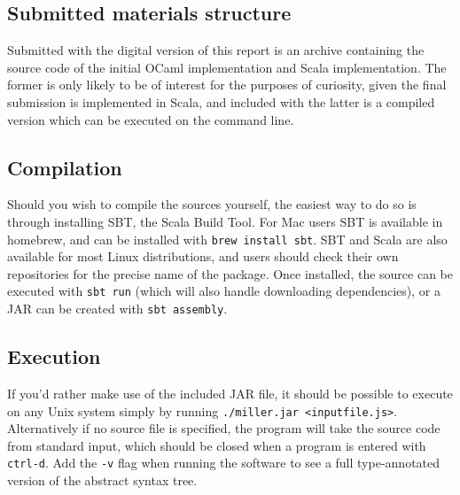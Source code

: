 \documentclass[british, twoside]{bhamthesis}
\theoremstyle{definition}
\begin{document}
\begin{appendices}
\chapter{Submitted materials structure}
Submitted with the digital version of this report is an archive containing the source code of the initial OCaml implementation and Scala implementation. The former is only likely to be of interest for the purposes of curiosity, given the final submission is implemented in Scala, and included with the latter is a compiled version which can be executed on the command line.

\section{Compilation}
Should you wish to compile the sources yourself, the easiest way to do so is through installing SBT, the Scala Build Tool. For Mac users SBT is available in homebrew, and can be installed with \texttt{brew install sbt}. SBT and Scala are also available for most Linux distributions, and users should check their own repositories for the precise name of the package. Once installed, the source can be executed with \texttt{sbt run} (which will also handle downloading dependencies), or a JAR can be created with \texttt{sbt assembly}.

\section{Execution}
If you'd rather make use of the included JAR file, it should be possible to execute on any Unix system simply by running \texttt{./miller.jar <inputfile.js>}. Alternatively if no source file is specified, the program will take the source code from standard input, which should be closed when a program is entered with \texttt{ctrl-d}. Add the \texttt{-v} flag when running the software to see a full type-annotated version of the abstract syntax tree.


\end{appendices}
\end{document}
